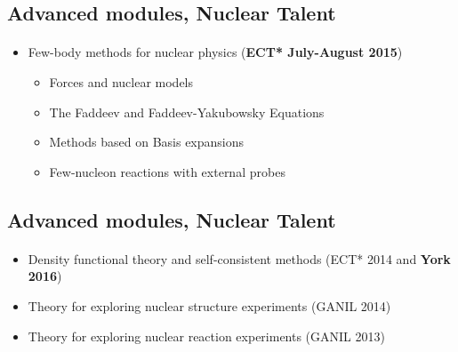 \documentclass[%
twoside,                 %
final,                   %
10pt]{article}
\begin{document}
\noindent





\subsection{Advanced  modules, Nuclear Talent}

\paragraph{}
\begin{itemize}
\item Few-body methods for nuclear physics (\textbf{ECT* July-August 2015})
\begin{itemize}

 \item Forces and nuclear models

 \item The Faddeev and Faddeev-Yakubowsky Equations

 \item Methods based on Basis expansions

 \item Few-nucleon reactions with external probes
\end{itemize}

\noindent
\end{itemize}

\noindent




\subsection{Advanced  modules, Nuclear Talent}

\paragraph{}
\begin{itemize}
\item Density functional theory and self-consistent methods (ECT* 2014 and \textbf{York 2016})

\item Theory for exploring nuclear structure experiments (GANIL 2014)

\item Theory for exploring nuclear reaction experiments (GANIL 2013)
\end{itemize}
\end{document}
